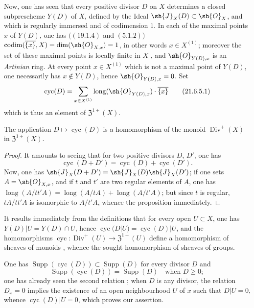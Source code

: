 \begin{env}[21.6.5]
\label{IV.21.6.5}
Now, one has seen that every positive divisor $D$ on $X$ determines a closed subprescheme $Y(D)$ of $X$, defined by the Ideal $\sh{J}_X(D)\subset\sh{O}_X$, and which is regularly immersed and of codimension $1$.
In each of the maximal points $x$ of $Y(D)$, one has $((19.1.4)$ and $(5.1.2))$ $\operatorname{codim}(\overline{\{x\}},X)=\dim(\sh{O}_{X,x})=1$, in other words $x\in X^{(1)}$;
moreover the set of these maximal points is locally finite in $X$ , and $\sh{O}_{Y(D),x}$ is an \emph{Artinian} ring.
At every point $x\in X^{(1)}$ which is not a maximal point of $Y(D)$, one necessarily has $x\notin Y(D)$, hence $\sh{O}_{Y(D),x}=0$.
Set
\[
\label{IV.21.6.5.1}
  \operatorname{cyc}(D)=\sum_{x\in X^{(1)}}\operatorname{long}(\sh{O}_{Y(D),x})\cdot\overline{\{x\}}
  \tag{21.6.5.1}
\]
which is thus an element of $\mathfrak{Z}^{1+}(X)$.
\end{env}

\begin{proposition}[21.6.6]
\label{IV.21.6.6}
The application $D\mapsto\operatorname{cyc}(D)$ is a homomorphism of the monoid $\operatorname{Div}^+(X)$ in $\mathfrak{Z}^{1+}(X)$.
\end{proposition}

\begin{proof}
It amounts to seeing that for two positive divisors $D$, $D'$, one has
\[
  \operatorname{cyc}(D+D')=\operatorname{cyc}(D)+\operatorname{cyc}(D').
\]
Now, one has  $\sh{J}_X(D+D')=\sh{J}_X(D)\sh{J}_X(D')$;
if one sets $A=\sh{O}_{X,x}$, and if $t$ and $t'$ are two regular elements of $A$, one has $\operatorname{long}(A/tt'A)=\operatorname{long}(A/tA)+\operatorname{long}(A/t'A)$;
but since $t$ is regular, $tA/tt'A$ is isomorphic to $A/t'A$, whence the proposition immediately.
\end{proof}

It results immediately from the definitions that for every open $U\subset X$, one has
$Y(D)|U=Y(D)\cap U$, hence $\operatorname{cyc}(D|U)=\operatorname{cyc}(D)|U$, and the homomorphisms $\operatorname{cyc}:\operatorname{Div}^+(U)\to\mathfrak{Z}^{1+}(U)$ define a homomorphism of sheaves of monoids , whence the sought homomorphism  of sheaves of groups.

One has $\operatorname{Supp}(\operatorname{cyc}(D))\subset\operatorname{Supp}(D)$ for every divisor $D$ and
\[
\label{IV.21.6.6.2}
  \operatorname{Supp}(\operatorname{cyc}(D))=\operatorname{Supp}(D)\quad\text{when }D\geq 0;
  \tag{21.6.6.2}
\]
one has already seen the second relation ;
when $D$ is any divisor, the relation $D_x=0$ implies the existence of an open neighbourhood $U$ of $x$ such that $D|U=0$, whence $\operatorname{cyc}(D)|U=0$, which proves our assertion.

